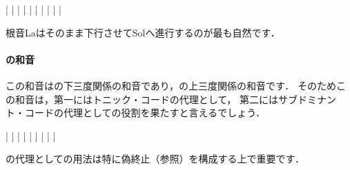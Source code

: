 \documentclass[dvipdfmx,uplatex,b5paper,openany,jbase=12Q,nomag*,textwidth-limit=44%
               ]{gachimuchi}[2020/05/05]
\begin{document}
\begin{floatMusic}[pos=ht]
  \Startpiece%
  \znotes|\en
  \NOTes
  |%
  \en\bar
  \NOTEs
  |%
  \en\doublebar
  \NOTEs
  |%
  \en\bar
  \NOTEs
  |%
  \en\doublebar
  \NOTes
  |%
  \en\bar
  \NOTes
  \Mryaku\sk%
  |%
  \Mryaku\sk
  \en\setdoublebar
  \endpiece%
\end{floatMusic}
根音La\aFlat はそのまま下行させてSolへ進行するのが最も自然です．


\paragraph{\Gnvi\Min の和音}
この和音は\Gni の下三度関係の和音であり，\Gniv の上三度関係の和音です．
そのためこの和音は，第一にはトニック・コードの代理として，
第二にはサブドミナント・コードの代理としての役割を果たすと言えるでしょう．

\begin{floatMusic}[pos=ht]
  \Startpiece%
  \znotes|\en
  \znotes|\en
  \NOTes
  |%
  \en\bar
  \NOTEs
  |%
  \en\doublebar
  \znotes|\en
  \NOTEs
  |%
  \en\bar
  \NOTEs
  |%
  \en\setdoublebar
  \endpiece%
\end{floatMusic}
の代理としての用法は特に偽終止（参照）を構成する上で重要です．
\end{document}

